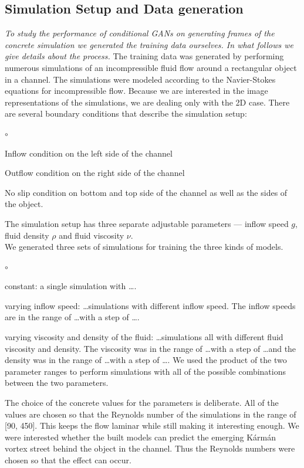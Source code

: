 \documentclass{llncs}
\begin{document}
\subsection{Simulation Setup and Data generation}
\emph{To study the performance of conditional GANs on generating frames of the concrete simulation we generated the training data ourselves. In what follows we give details about the process.} The training data was generated by performing numerous simulations of an incompressible fluid flow around a rectangular object in a channel. The simulations were modeled according to the Navier-Stokes equations for incompressible flow. Because we are interested in the image representations of the simulations, we are dealing only with the 2D case. There are several boundary conditions that describe the simulation setup:
\begin{list}{$\circ$}{}
\item Inflow condition on the left side of the channel
\item Outflow condition on the right side of the channel
\item No slip condition on bottom and top side of the channel as well as the sides of the object.
\end{list}
The simulation setup has three separate adjustable parameters --- inflow speed $g$, fluid density $\rho$ and fluid viscosity $\nu$.
\\
We generated three sets of simulations for training the three kinds of models.
\begin{list}{$\circ$}{}
\item constant: a single simulation with \ldots.
\item varying inflow speed: \ldots simulations with different inflow speed. The inflow speeds are in the range of \ldots with a step of \ldots.
\item varying viscosity and density of the fluid: \ldots simulations all with different fluid viscosity and density. The viscosity was in the range of \ldots with a step of \ldots and the density was in the range of \ldots with a step of \ldots. We used the product of the two parameter ranges to perform simulations with all of the possible combinations between the two parameters.
\end{list}

The choice of the concrete values for the parameters is deliberate. All of the values are chosen so that the Reynolds number of the simulations in the range of [90, 450]. This keeps the flow laminar while still making it interesting enough. We were interested whether the built models can predict the emerging Kármán vortex street behind the object in the channel. Thus the Reynolds numbers were chosen so that the effect can occur.
\end{document}
